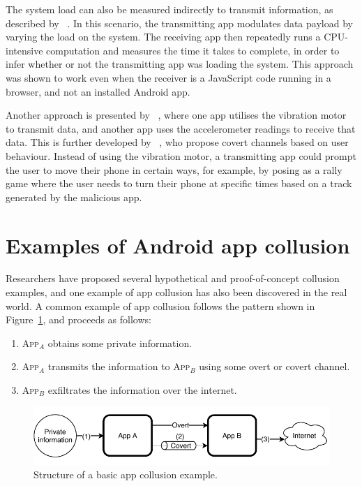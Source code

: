 \documentclass[article, oneside]{aaltoseries}
\newcommand{\TODO}[1]{\todo[inline]{#1}}
\newcommand{\Fref}[1]{Figure~\ref{#1}}
\newcommand{\app}[1]{A\textsc{pp}$_{#1}$\xspace}
\begin{document}
The system load can also be measured indirectly to transmit information, as described by \citeauthor{Marforio2012}~\cite{Marforio2012}. In this scenario, the transmitting app modulates data payload by varying the load on the system. The receiving app then repeatedly runs a CPU-intensive computation and measures the time it takes to complete, in order to infer whether or not the transmitting app was loading the system. This approach was shown to work even when the receiver is a JavaScript code running in a browser, and not an installed Android app.

Another approach is presented by \citeauthor{Al-Haiqi2014}~\cite{Al-Haiqi2014}, where one app utilises the vibration motor to transmit data, and another app uses the accelerometer readings to receive that data. This is further developed by \citeauthor{Qi2018}~\cite{Qi2018}, who propose covert channels based on user behaviour. Instead of using the vibration motor, a transmitting app could prompt the user to move their phone in certain ways, for example, by posing as a rally game where the user needs to turn their phone at specific times based on a track generated by the malicious app.
\\
\TODO{Add a subsection conclusion paragraph}

\section{Examples of Android app collusion}
\label{sec:examples}

Researchers have proposed several hypothetical and proof-of-concept collusion examples, and one example of app collusion has also been discovered in the real world. A common example of app collusion follows the pattern shown in \Fref{fig:sample}, and proceeds as follows:
\begin{enumerate}[nosep,label={(\arabic*)}]
	\item \app{A} obtains some private information.
	\item \app{A} transmits the information to \app{B} using some overt or covert channel.
	\item \app{B} exfiltrates the information over the internet.
\end{enumerate}

\begin{figure}[h]
	\centering
	\includegraphics[width=1.0\textwidth]{figures/Collusion1}
	\caption{Structure of a basic app collusion example.}
	\label{fig:sample}
\end{figure}
\end{document}
